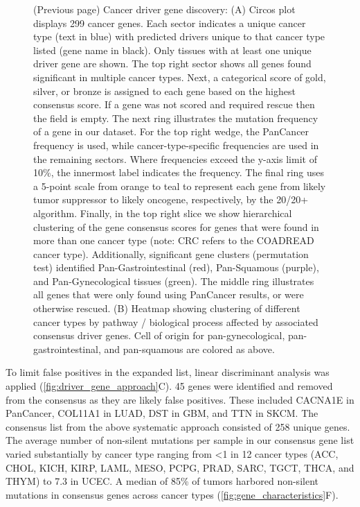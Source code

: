 \begin{figure} [t!]
  \caption[Cancer driver gene discovery]{(Previous page) Cancer driver gene discovery: (A) Circos \cite{RN182} plot displays 299 cancer genes. Each sector indicates a unique cancer type (text in blue) with predicted drivers unique to that cancer type listed (gene name in black). Only tissues with at least one unique driver gene are shown. The top right sector shows all genes found significant in multiple cancer types. Next, a categorical score of gold, silver, or bronze is assigned to each gene based on the highest consensus score. If a gene was not scored and required rescue then the field is empty. The next ring illustrates the mutation frequency of a gene in our dataset. For the top right wedge, the PanCancer frequency is used, while cancer-type-specific frequencies are used in the remaining sectors. Where frequencies exceed the y-axis limit of 10\%, the innermost label indicates the frequency. The final ring uses a 5-point scale from orange to teal to represent each gene from likely tumor suppressor to likely oncogene, respectively, by the 20/20+ algorithm. Finally, in the top right slice we show hierarchical clustering of the gene consensus scores for genes that were found in more than one cancer type (note: CRC refers to the COADREAD cancer type). Additionally, significant gene clusters (permutation test) identified Pan-Gastrointestinal (red), Pan-Squamous (purple), and Pan-Gynecological tissues (green). The middle ring illustrates all genes that were only found using PanCancer results, or were otherwise rescued. (B) Heatmap showing clustering of different cancer types by pathway / biological process affected by associated consensus driver genes. Cell of origin for pan-gynecological, pan-gastrointestinal, and pan-squamous are colored as above.}
\end{figure}

To limit false positives in the expanded list, linear discriminant analysis was applied (\autoref{fig:driver_gene_approach}C). 45 genes were identified and removed from the consensus as they are likely false positives. These included CACNA1E in PanCancer, COL11A1 in LUAD, DST in GBM, and TTN in SKCM. The consensus list from the above systematic approach consisted of 258 unique genes. The average number of non-silent mutations per sample in our consensus gene list varied substantially by cancer type ranging from <1 in 12 cancer types (ACC, CHOL, KICH, KIRP, LAML, MESO, PCPG, PRAD, SARC, TGCT, THCA, and THYM) to 7.3 in UCEC. A median of 85\% of tumors harbored non-silent mutations in consensus genes across cancer types (\autoref{fig:gene_characteristics}F). 

